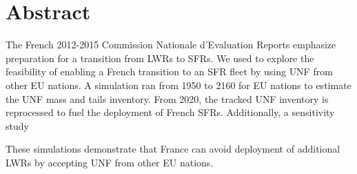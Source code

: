\section{Abstract}
The French 2012-2015 Commission Nationale d'Evaluation Reports
\cite{cne2_reports_2015} emphasize preparation for a transition from \glspl{LWR} to \glspl{SFR}.
We used \Cyclus \cite{huff_fundamental_2016} to explore the feasibility of enabling a French
transition to an \gls{SFR} fleet by using \gls{UNF} from other \gls{EU} nations.
A \Cyclus simulation ran from 1950 to 2160 for \gls{EU} nations to estimate the \gls{UNF} mass
and tails inventory. From 2020, the tracked \gls{UNF} inventory is reprocessed 
to fuel the deployment of  French \glspl{SFR}. Additionally, a sensitivity study 

These simulations demonstrate that France can avoid deployment
of additional \glspl{LWR} by accepting \gls{UNF} from other EU nations.
